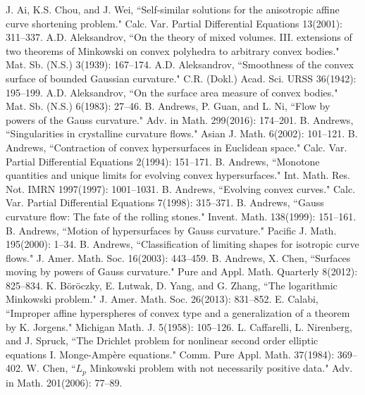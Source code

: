 \documentclass{amsart}
\theoremstyle{definition}
\theoremstyle{remark}
\numberwithin{equation}{section}
\begin{document}

\begin{thebibliography}{10}
J. Ai, K.S. Chou, and J. Wei, ``Self-similar solutions for the anisotropic affine curve shortening problem." Calc. Var. Partial Differential Equations 13(2001): 311--337.
 A.D. Aleksandrov, ``On the theory of mixed volumes. III. extensions of two theorems of Minkowski on convex polyhedra to arbitrary convex bodies." Mat. Sb. (N.S.) 3(1939): 167--174.
 A.D. Aleksandrov, ``Smoothness of the convex surface of bounded Gaussian curvature." C.R. (Dokl.) Acad. Sci. URSS 36(1942): 195--199.
 A.D. Aleksandrov, ``On the surface area measure of convex bodies." Mat. Sb. (N.S.) 6(1983): 27--46.
 B. Andrews, P. Guan, and L. Ni, ``Flow by powers of the Gauss curvature." Adv. in Math. 299(2016): 174--201.
 B. Andrews, ``Singularities in crystalline curvature flows." Asian J. Math. 6(2002): 101--121.
 B. Andrews, ``Contraction of convex hypersurfaces in Euclidean space." Calc. Var. Partial Differential Equations 2(1994): 151--171.
 B. Andrews, ``Monotone quantities and unique limits for evolving convex hypersurfaces." Int. Math. Res. Not. IMRN 1997(1997): 1001--1031.
 B. Andrews, ``Evolving convex curves." Calc. Var. Partial Differential Equations 7(1998): 315--371.
 B. Andrews, ``Gauss curvature flow: The fate of the rolling stones." Invent. Math. 138(1999): 151--161.
 B. Andrews, ``Motion of hypersurfaces by Gauss curvature." Pacific J. Math. 195(2000): 1--34.
 B. Andrews, ``Classification of limiting shapes for isotropic curve flows." J. Amer. Math. Soc. 16(2003): 443--459.
 B. Andrews, X. Chen, ``Surfaces moving by powers of Gauss curvature." Pure and Appl. Math. Quarterly 8(2012): 825--834.
 K. B\"{o}r\"{o}czky, E. Lutwak, D. Yang, and G. Zhang, ``The logarithmic Minkowski problem." J. Amer. Math. Soc. 26(2013): 831--852.
 E. Calabi, ``Improper affine hyperspheres of convex type and a generalization of a theorem by K. Jorgens." Michigan Math. J. 5(1958): 105--126.
  L. Caffarelli, L. Nirenberg, and J. Spruck, ``The Drichlet problem for nonlinear second order elliptic equations I. Monge-Amp\`{e}re equations." Comm. Pure Appl. Math. 37(1984): 369--402.
  W. Chen, ``$L_p$ Minkowski problem with not necessarily positive data." Adv. in Math. 201(2006): 77--89.

\end{thebibliography}
\end{document}
